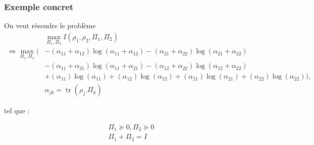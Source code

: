 \documentclass{beamer}
\DeclareMathOperator{\tr}{tr}
\begin{document}
\begin{frame}
    \frametitle{Exemple concret}
    \tiny
    \begin{block}{}
        On veut résoudre le problème 
        \begin{align}
            &\max\limits_{\Pi_1, \Pi_2} I(\rho_1, \rho_2, \Pi_1, \Pi_2) \\
% 
\Leftrightarrow \max\limits_{\Pi_1, \Pi_2} \big(&-(\alpha_{11} + \alpha_{12})\log(\alpha_{11} + \alpha_{12}) - (\alpha_{21} + \alpha_{22})\log(\alpha_{21} + \alpha_{22}) \nonumber \\
             &- (\alpha_{11} + \alpha_{21})\log(\alpha_{11} + \alpha_{21}) - (\alpha_{12} + \alpha_{22})\log(\alpha_{12} + \alpha_{22}) \nonumber \\
             &+ (\alpha_{11})\log(\alpha_{11}) + (\alpha_{12})\log(\alpha_{12}) + (\alpha_{21})\log(\alpha_{21}) + (\alpha_{22})\log(\alpha_{22}) \big),\nonumber\\
             &\alpha_{jk} = \tr(\rho_j . \Pi_k) \nonumber
        \end{align}

        tel que :

        \begin{align}
            \Pi_1 \succeq 0, \Pi_2 \succeq 0\\
            \Pi_1 + \Pi_2 = I 
        \end{align}

    \end{block}
\end{frame}
\end{document}
